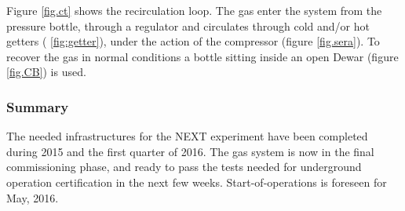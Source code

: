 Figure \ref{fig.ct} shows the recirculation loop. The gas enter the system from the pressure bottle, through a regulator and circulates through cold and/or hot getters ( \ref{fig:getter}), under the action of the compressor 
(figure \ref{fig.sera}). To recover the gas in normal conditions a bottle sitting inside an open Dewar (figure \ref{fig.CB}) is used. 

\subsubsection*{Summary}
 
The needed infrastructures for the NEXT experiment have been completed during 2015 and the first quarter of 2016. The gas system is now in the final commissioning phase, and ready to pass the tests needed for underground operation certification in the next few weeks. Start-of-operations is foreseen for May, 2016. 
